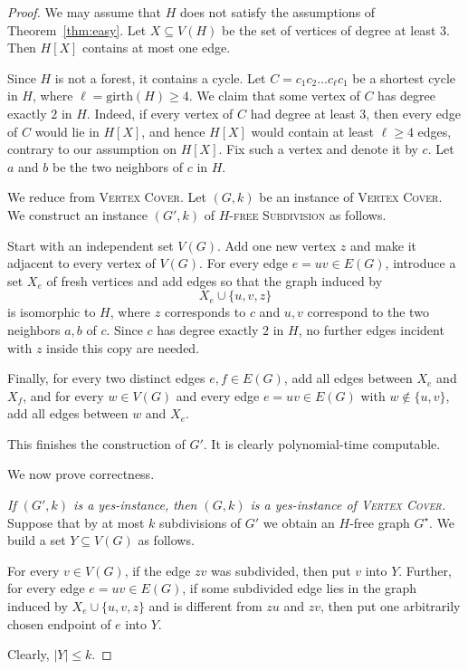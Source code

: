 \documentclass[a4paper,UKenglish,cleveref, autoref, thm-restate]{lipics-v2021}
\newcommand{\girth}{\mathrm{girth}}
\begin{document}
\begin{proof}
We may assume that $H$ does not satisfy the assumptions of
Theorem~\ref{thm:easy}.
Let $X\subseteq V(H)$ be the set of vertices of degree at least $3$.
Then $H[X]$ contains at most one edge.

Since $H$ is not a forest, it contains a cycle.
Let $C=c_1c_2\ldots c_\ell c_1$ be a shortest cycle in $H$, where
$\ell=\girth(H)\geq 4$.
We claim that some vertex of $C$ has degree exactly $2$ in $H$.
Indeed, if every vertex of $C$ had degree at least $3$, then every edge of $C$
would lie in $H[X]$, and hence $H[X]$ would contain at least $\ell\geq 4$ edges,
contrary to our assumption on $H[X]$.
Fix such a vertex and denote it by $c$.
Let $a$ and $b$ be the two neighbors of $c$ in $H$.

We reduce from \textsc{Vertex Cover}.
Let $(G,k)$ be an instance of \textsc{Vertex Cover}.
We construct an instance $(G',k)$ of \textsc{$H$-free Subdivision} as follows.

Start with an independent set $V(G)$.
Add one new vertex $z$ and make it adjacent to every vertex of $V(G)$.
For every edge $e=uv\in E(G)$, introduce a set $X_e$ of fresh vertices and add
edges so that the graph induced by
\[
X_e\cup \{u,v,z\}
\]
is isomorphic to $H$, where $z$ corresponds to $c$ and $u,v$ correspond to the
two neighbors $a,b$ of $c$.
Since $c$ has degree exactly $2$ in $H$, no further edges incident with $z$
inside this copy are needed.

Finally, for every two distinct edges $e,f\in E(G)$, add all edges between
$X_e$ and $X_f$, and for every $w\in V(G)$ and every edge $e=uv\in E(G)$ with
$w\notin \{u,v\}$, add all edges between $w$ and $X_e$.

This finishes the construction of $G'$.
It is clearly polynomial-time computable.

We now prove correctness.

\smallskip
\noindent
\emph{If $(G',k)$ is a yes-instance, then $(G,k)$ is a yes-instance of
\textsc{Vertex Cover}.}
Suppose that by at most $k$ subdivisions of $G'$ we obtain an $H$-free graph
$G^\star$.
We build a set $Y\subseteq V(G)$ as follows.

For every $v\in V(G)$, if the edge $zv$ was subdivided, then put $v$ into $Y$.
Further, for every edge $e=uv\in E(G)$, if some subdivided edge lies in the graph
induced by $X_e\cup\{u,v,z\}$ and is different from $zu$ and $zv$, then put
one arbitrarily chosen endpoint of $e$ into $Y$.

Clearly, $|Y|\leq k$.


\end{proof}
\end{document}

